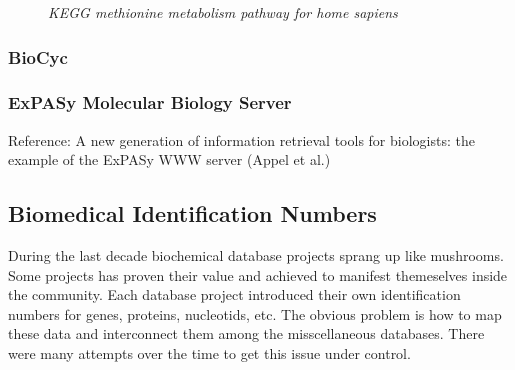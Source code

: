 \begin{figure}[ht]
\centering
{} 
\caption[KEGG methionine metabolism pathway for home sapiens]{\textit{KEGG methionine metabolism pathway for home sapiens}} 
\label{gfx:KEGG_methionine_metabolism_271_pathway_hsa}
\end{figure}

\subsubsection{BioCyc}
\subsubsection{ExPASy Molecular Biology Server}

Reference: A new generation of information retrieval tools for biologists: the example of the ExPASy WWW server (Appel et al.)

\subsection{Biomedical Identification Numbers}

During the last decade biochemical database projects sprang up like mushrooms. Some projects has proven their value and achieved to manifest themeselves inside the community. Each database project introduced their own identification numbers for genes, proteins, nucleotids, etc. The obvious problem is how to map these data and interconnect them among the misscellaneous databases. 
There were many attempts over the time to get this issue under control.

